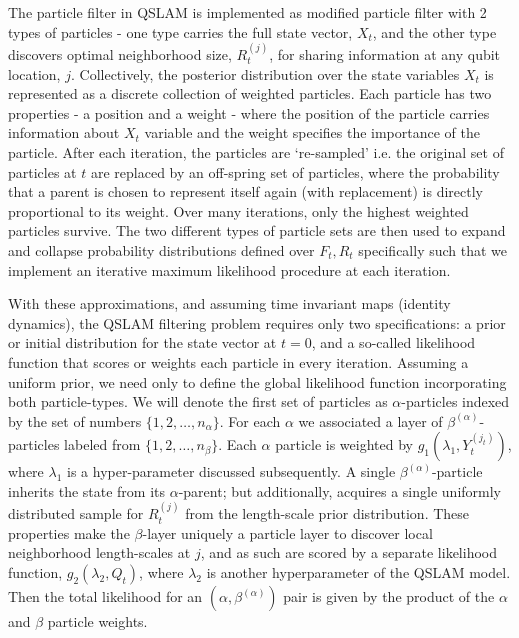 The particle filter in QSLAM is implemented as modified particle filter with 2 types of particles - one type carries the full state vector, $X_t$, and the other type discovers optimal neighborhood size, $R_t^{(j)}$, for sharing information at any qubit location, $j$.   Collectively, the posterior distribution over the state variables $X_t$ is represented as a discrete collection of weighted particles. Each particle has two properties - a position and a weight - where the position of the particle carries information about $X_t$ variable and the weight specifies the importance of the particle. After each iteration, the particles are `re-sampled' i.e. the original set of particles at $t$ are replaced by an off-spring set of particles, where the probability that a parent is chosen to represent itself again (with replacement) is directly proportional to its weight. Over many iterations, only the highest weighted particles survive.  The two different types of particle sets are then used to expand and collapse probability distributions defined over $F_t, R_t$ specifically such that we implement an iterative maximum likelihood procedure at each iteration.

With these approximations, and assuming time invariant maps (identity dynamics), the QSLAM filtering problem requires only two specifications: a prior or initial distribution for the state vector at $t=0$, and a so-called likelihood function that scores or weights each particle in every iteration. Assuming a uniform prior, we need only to define the global likelihood function incorporating both particle-types. We will denote the first set of particles as $\alpha$-particles indexed by the set of numbers $\{1, 2, \hdots, n_\alpha\}$. For each $\alpha$ we associated a layer of $\beta^{(\alpha)}$-particles labeled from $\{1, 2, \hdots, n_\beta \}$. Each  $\alpha$ particle is weighted by $ g_1(\lambda_1, Y_t^{(j_t)})$, where $\lambda_1$ is a hyper-parameter discussed subsequently. A single $\beta^{(\alpha)}$-particle inherits the state from its $\alpha$-parent; but additionally, acquires a single uniformly distributed sample for $R_t^{(j)}$ from the length-scale prior distribution. These properties make the $\beta$-layer uniquely a particle layer to discover local neighborhood length-scales at $j$, and as such are scored by a separate likelihood function, $g_2(\lambda_2, Q_t)$, where $\lambda_2$ is another hyperparameter of the QSLAM model. Then the total likelihood for an $(\alpha, \beta^{(\alpha)})$ pair is given by the product of the $\alpha$ and $\beta$ particle weights. %

